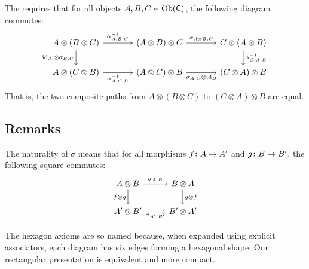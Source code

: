 \documentclass[../preamble]{subfiles}
\begin{document}
\begin{definition}
  \label{def:hexagon-2}
  The  requires that
  for all objects $A, B, C \in \operatorname{Ob}(\mathsf{C})$,
  the following diagram commutes:
  \begin{equation}
    \label{eq:hexagon-2}
    \begin{tikzcd}[column sep=large]
      A \otimes (B \otimes C)
        \arrow[r, "\alpha^{-1}_{A,B,C}"]
        \arrow[d, "\id_A \otimes \sigma_{B,C}"']
      & (A \otimes B) \otimes C
        \arrow[r, "\sigma_{A \otimes B, C}"]
      & C \otimes (A \otimes B)
        \arrow[d, "\alpha^{-1}_{C,A,B}"]
      \\
      A \otimes (C \otimes B)
        \arrow[r, "\alpha^{-1}_{A,C,B}"']
      & (A \otimes C) \otimes B
        \arrow[r, "\sigma_{A,C} \otimes \id_B"']
      & (C \otimes A) \otimes B
    \end{tikzcd}
  \end{equation}
  That is,
  the two composite paths from
  $A \otimes (B \otimes C)$
  to
  $(C \otimes A) \otimes B$
  are equal.
\end{definition}

\subsection{Remarks}

\begin{remark}
  \label{rem:braiding-naturality}
  The naturality of $\sigma$ means that
  for all morphisms
  $f \colon A \lto A'$ and $g \colon B \lto B'$,
  the following square commutes:
  \begin{equation}
    \label{eq:braiding-naturality}
    \begin{tikzcd}
      A \otimes B
        \arrow[r, "\sigma_{A,B}"]
        \arrow[d, "f \otimes g"']
      & B \otimes A
        \arrow[d, "g \otimes f"]
      \\
      A' \otimes B'
        \arrow[r, "\sigma_{A',B'}"']
      & B' \otimes A'
    \end{tikzcd}
  \end{equation}
\end{remark}

\begin{remark}
  \label{rem:hexagon-naming}
  The hexagon axioms are so named because,
  when expanded using explicit associators,
  each diagram has six edges forming a hexagonal shape.
  Our rectangular presentation is equivalent
  and more compact.
\end{remark}
\end{document}
